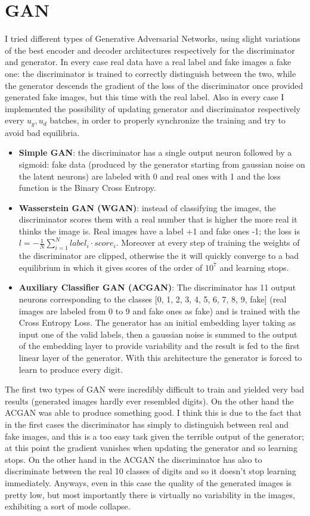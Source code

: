 \documentclass[a4paper, 11pt]{article}
\begin{document}
\section{GAN}
  I tried different types of Generative Adversarial Networks, using slight variations of the best encoder and decoder architectures respectively for the discriminator and generator. In every case real data have a real label and fake images a fake one: the discriminator is trained to correctly distinguish between the two, while the generator descends the gradient of the loss of the discriminator once provided generated fake images, but this time with the real label. Also in every case I implemented the possibility of updating generator and discriminator respectively every $u_g, u_d$ batches, in order to properly synchronize the training and try to avoid bad equilibria.
  \begin{itemize}
    \item \textbf{Simple GAN}: the discriminator has a single output neuron followed by a sigmoid: fake data (produced by the generator starting from gaussian noise on the latent neurons) are labeled with 0 and real ones with 1 and the loss function is the Binary Cross Entropy.
    \item \textbf{Wasserstein GAN (WGAN)}: instead of classifying the images, the discriminator scores them with a real number that is higher the more real it thinks the image is. Real images have a label +1 and fake ones -1; the loss is $l = -\frac{1}{N}\sum_{i=1}^N label_i\cdot score_i$. Moreover at every step of training the weights of the discriminator are clipped, otherwise the it will quickly converge to a bad equilibrium in which it gives scores of the order of $10^7$ and learning stops.
    \item \textbf{Auxiliary Classifier GAN (ACGAN)}: The discriminator has 11 output neurons corresponding to the classes [0, 1, 2, 3, 4, 5, 6, 7, 8, 9, fake] (real images are labeled from 0 to 9 and fake ones as fake) and is trained with the Cross Entropy Loss. The generator has an initial embedding layer taking as input one of the valid labels, then a gaussian noise is summed to the output of the embedding layer to provide variability and the result is fed to the first linear layer of the generator. With this architecture the generator is forced to learn to produce every digit.
  \end{itemize}

  The first two types of GAN were incredibly difficult to train and yielded very bad results (generated images hardly ever resembled digits). On the other hand the ACGAN was able to produce something good. I think this is due to the fact that in the first cases the discriminator has simply to distinguish between real and fake images, and this is a too easy task given the terrible output of the generator; at this point the gradient vanishes when updating the generator and so learning stops. On the other hand in the ACGAN the discriminator has also to discriminate between the real 10 classes of digits and so it doesn't stop learning immediately. Anyways, even in this case the quality of the generated images is pretty low, but most importantly there is virtually no variability in the images, exhibiting a sort of mode collapse.
\end{document}
